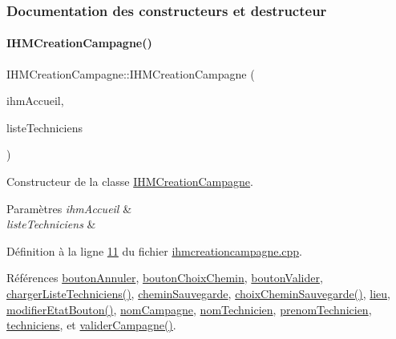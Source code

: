 \subsubsection{Documentation des constructeurs et destructeur}
\mbox{\label{class_i_h_m_creation_campagne_a0e9cce2b950a638f1bf012b79d05eb9c}} 
\paragraph{\texorpdfstring{I\+H\+M\+Creation\+Campagne()}{IHMCreationCampagne()}}
{\footnotesize\ttfamily I\+H\+M\+Creation\+Campagne\+::\+I\+H\+M\+Creation\+Campagne (\begin{DoxyParamCaption}\item[{\hyperlink{class_i_h_m_accueil}{I\+H\+M\+Accueil} $\ast$}]{ihm\+Accueil,  }\item[{Q\+Vector$<$ Q\+String\+List $>$ \&}]{liste\+Techniciens }\end{DoxyParamCaption})\hspace{0.3cm}{\ttfamily [explicit]}}



Constructeur de la classe \hyperlink{class_i_h_m_creation_campagne}{I\+H\+M\+Creation\+Campagne}. 


\begin{DoxyParams}{Paramètres}
{\em ihm\+Accueil} & \\
\hline
{\em liste\+Techniciens} & \\
\hline
\end{DoxyParams}


Définition à la ligne \hyperlink{ihmcreationcampagne_8cpp_source_l00011}{11} du fichier \hyperlink{ihmcreationcampagne_8cpp_source}{ihmcreationcampagne.\+cpp}.



Références \hyperlink{ihmcreationcampagne_8h_source_l00033}{bouton\+Annuler}, \hyperlink{ihmcreationcampagne_8h_source_l00034}{bouton\+Choix\+Chemin}, \hyperlink{ihmcreationcampagne_8h_source_l00032}{bouton\+Valider}, \hyperlink{ihmcreationcampagne_8cpp_source_l00061}{charger\+Liste\+Techniciens()}, \hyperlink{ihmcreationcampagne_8h_source_l00031}{chemin\+Sauvegarde}, \hyperlink{ihmcreationcampagne_8cpp_source_l00104}{choix\+Chemin\+Sauvegarde()}, \hyperlink{ihmcreationcampagne_8h_source_l00030}{lieu}, \hyperlink{ihmcreationcampagne_8cpp_source_l00086}{modifier\+Etat\+Bouton()}, \hyperlink{ihmcreationcampagne_8h_source_l00027}{nom\+Campagne}, \hyperlink{ihmcreationcampagne_8h_source_l00028}{nom\+Technicien}, \hyperlink{ihmcreationcampagne_8h_source_l00029}{prenom\+Technicien}, \hyperlink{ihmcreationcampagne_8h_source_l00035}{techniciens}, et \hyperlink{ihmcreationcampagne_8cpp_source_l00071}{valider\+Campagne()}.


